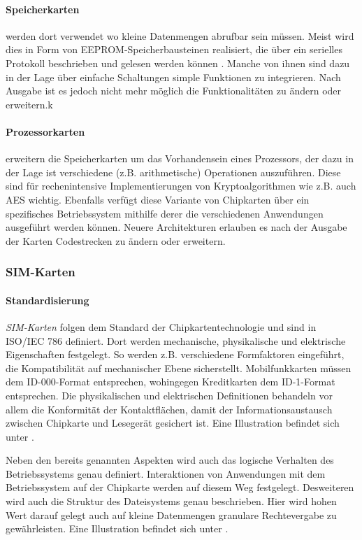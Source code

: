 \paragraph{Speicherkarten} werden dort verwendet wo kleine Datenmengen abrufbar
sein müssen. Meist wird dies in Form von \ac{EEPROM}-Speicherbausteinen realisiert,
die über ein serielles Protokoll beschrieben und gelesen werden können \cite{spitz11}.
Manche von ihnen sind dazu in der Lage über einfache Schaltungen simple Funktionen
zu integrieren. Nach Ausgabe ist es jedoch nicht mehr möglich die Funktionalitäten
zu ändern oder erweitern.k

\paragraph{Prozessorkarten} erweitern die Speicherkarten um das Vorhandensein
eines Prozessors, der dazu in der Lage ist verschiedene (z.B. arithmetische)
Operationen auszuführen. Diese sind für rechenintensive Implementierungen
von Kryptoalgorithmen wie z.B. auch AES wichtig. Ebenfalls verfügt diese
Variante von Chipkarten über ein spezifisches Betriebssystem mithilfe derer
die verschiedenen Anwendungen ausgeführt werden können.
Neuere Architekturen erlauben es nach der Ausgabe der Karten Codestrecken
zu ändern oder erweitern.

\subsubsection{SIM-Karten}

\paragraph{Standardisierung}
\textit{SIM-Karten} folgen dem Standard der Chipkartentechnologie und sind in
ISO/IEC 786 definiert. Dort werden mechanische, physikalische und elektrische
Eigenschaften festgelegt.
So werden z.B. verschiedene Formfaktoren eingeführt, die Kompatibilität
auf mechanischer Ebene sicherstellt. Mobilfunkkarten müssen dem ID-000-Format
entsprechen, wohingegen Kreditkarten dem ID-1-Format entsprechen. Die physikalischen und elektrischen
Definitionen behandeln vor allem die Konformität der Kontaktflächen, damit
der Informationsaustausch zwischen Chipkarte und Lesegerät gesichert ist.
Eine Illustration befindet sich unter .

Neben den bereits genannten Aspekten wird auch das logische Verhalten des Betriebssystems
genau definiert. Interaktionen von Anwendungen mit dem Betriebssystem auf der Chipkarte
werden auf diesem Weg festgelegt. Desweiteren wird auch die Struktur des Dateisystems
genau beschrieben. Hier wird hohen Wert darauf gelegt auch auf kleine Datenmengen
granulare Rechtevergabe zu gewährleisten.
Eine Illustration befindet sich unter .

